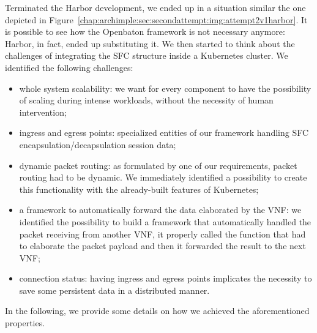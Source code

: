 Terminated the Harbor development, we ended up in a situation similar the one
depicted in Figure~\ref{chap:archimple:sec:secondattempt:img:attempt2v1harbor}.
It is possible to see how the Openbaton framework is not necessary anymore:
Harbor, in fact, ended up substituting it. We then started to think about the
challenges of integrating the SFC structure inside a Kubernetes cluster. We
identified the following challenges:
\begin{itemize}
\item whole system scalability: we want for every component to have the
  possibility of scaling during intense workloads, without the necessity of
  human intervention;
\item ingress and egress points: specialized entities of our framework handling
  SFC encapsulation/decapsulation session data;
\item dynamic packet routing: as formulated by one of our requirements, packet
  routing had to be dynamic. We immediately identified a possibility to create
  this functionality with the already-built features of Kubernetes;
\item a framework to automatically forward the data elaborated by the VNF: we
  identified the possibility to build a framework that automatically handled the
  packet receiving from another VNF, it properly called the function that had to
  elaborate the packet payload and then it forwarded the result to the next VNF;
\item connection status: having ingress and egress points implicates the
  necessity to save some persistent data in a distributed manner.
\end{itemize}
In the following, we provide some details on how we achieved the aforementioned
properties.

